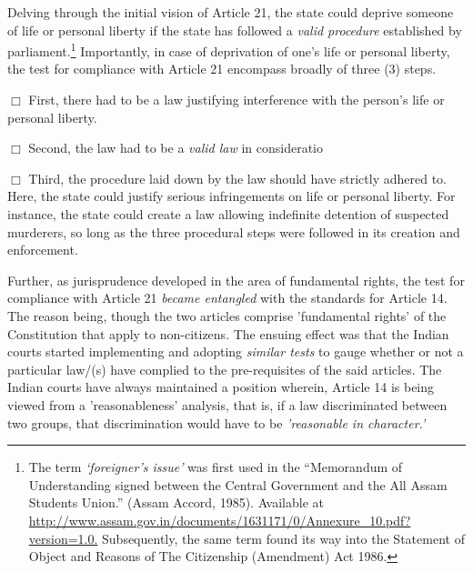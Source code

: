 \begin{multicols}{2}
\noi
Delving through the initial vision of Article 21, the state could deprive someone of life or
personal liberty if the state has followed a \textit{valid procedure} established by
parliament.\footnote{The term \textit{‘foreigner’s issue’} was first used in the “Memorandum of Understanding signed between the Central Government and the All Assam Students Union.” (Assam Accord, 1985). Available at\\ \url{http://www.assam.gov.in/documents/1631171/0/Annexure_10.pdf?version=1.0.} Subsequently, the same term
found its way into the Statement of Object and Reasons of The Citizenship (Amendment) Act 1986.} Importantly, in case of deprivation of one's life or personal liberty, the test for
compliance with Article 21 encompass broadly of three (3) steps.

\vspace{-.1cm}

\noi
$\Box$ First, there had to be a law justifying interference with the person's life or personal liberty.

\vspace{-.1cm}

\noi
$\Box$ Second, the law had to be a \textit{valid law} in consideratio

\vspace{-.1cm}

\noi
$\Box$  Third, the procedure laid down by the law should have strictly adhered to. Here, the state
could justify serious infringements on life or personal liberty. For instance, the state could
create a law allowing indefinite detention of suspected murderers, so long as the three
procedural steps were followed in its creation and enforcement.

\vspace{-.1cm}

\noi
Further, as jurisprudence developed in the area of fundamental rights, the test for compliance
with Article 21 \textit{became entangled} with the standards for Article 14. The reason being, though
the two articles comprise 'fundamental rights' of the Constitution that apply to non-citizens.
The ensuing effect was that the Indian courts started implementing and adopting \textit{similar tests}
to gauge whether or not a particular law/(s) have complied to the pre-requisites of the said
articles. The Indian courts have always maintained a position wherein, Article 14 is being
viewed from a 'reasonableness' analysis, that is, if a law discriminated between two groups,
that discrimination would have to be \textit{'reasonable in character.'}


\end{multicols}
